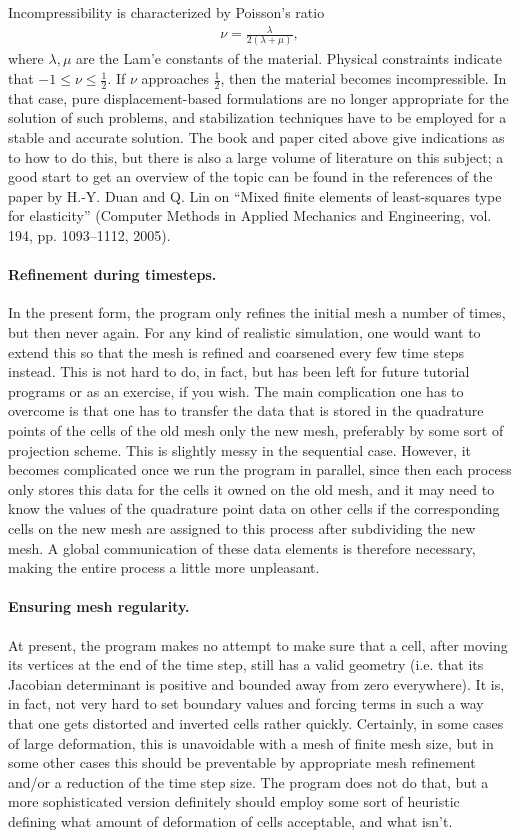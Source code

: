 \documentclass{article}
\begin{document}
Incompressibility is characterized by Poisson's ratio
\begin{gather*}
  \nu = \frac{\lambda}{2(\lambda+\mu)},
\end{gather*}
where $\lambda,\mu$ are the Lam'e constants of the material.
Physical constraints indicate that $-1\le \nu\le \tfrac 12$. If $\nu$
approaches $\tfrac 12$, then the material becomes incompressible. In that
case, pure displacement-based formulations are no longer appropriate for the
solution of such problems, and stabilization techniques have to be employed
for a stable and accurate solution. The book and paper cited above give
indications as to how to do this, but there is also a large volume of
literature on this subject; a good start to get an overview of the topic can
be found in the references of the paper by
H.-Y. Duan and Q. Lin on ``Mixed finite elements of least-squares type for
elasticity'' (Computer Methods in Applied Mechanics and Engineering, vol. 194,
pp. 1093--1112, 2005).


\paragraph*{Refinement during timesteps.} In the present form, the program
only refines the initial mesh a number of times, but then never again. For any
kind of realistic simulation, one would want to extend this so that the mesh
is refined and coarsened every few time steps instead. This is not hard to do,
in fact, but has been left for future tutorial programs or as an exercise, if
you wish. The main complication one has to overcome is that one has to
transfer the data that is stored in the quadrature points of the cells of the
old mesh only the new mesh, preferably by some sort of projection scheme. This
is slightly messy in the sequential case. However, it becomes complicated once
we run the program in parallel, since then each process only stores this data
for the cells it owned on the old mesh, and it may need to know the values of
the quadrature point data on other cells if the corresponding cells on the new
mesh are assigned to this process after subdividing the new mesh. A global
communication of these data elements is therefore necessary, making the entire
process a little more unpleasant.


\paragraph*{Ensuring mesh regularity.} At present, the program makes no attempt
to make sure that a cell, after moving its vertices at the end of the time
step, still has a valid geometry (i.e. that its Jacobian determinant is
positive and bounded away from zero everywhere). It is, in fact, not very hard
to set boundary values and forcing terms in such a way that one gets distorted
and inverted cells rather quickly. Certainly, in some cases of large
deformation, this is unavoidable with a mesh of finite mesh size, but in some
other cases this should be preventable by appropriate mesh refinement and/or a
reduction of the time step size. The program does not do that, but a more
sophisticated version definitely should employ some sort of heuristic defining
what amount of deformation of cells acceptable, and what isn't.
\end{document}
